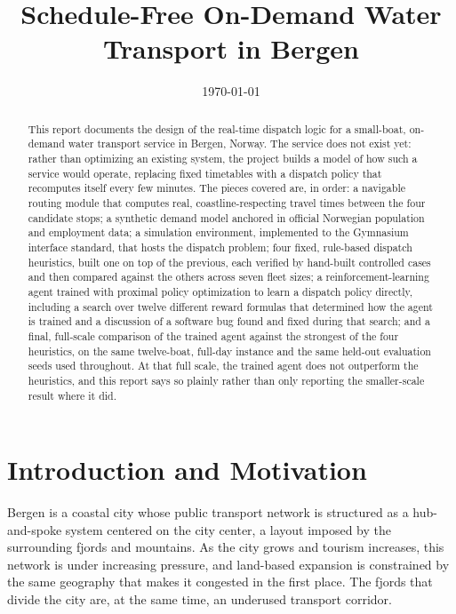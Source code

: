 \documentclass[11pt,a4paper]{article}
\title{Schedule-Free On-Demand Water Transport in Bergen}
\author{}
\date{\today}
\begin{document}
\maketitle

\begin{abstract}
\noindent
This report documents the design of the real-time dispatch logic for a small-boat, on-demand water transport service in Bergen, Norway. The service does not exist yet: rather than optimizing an existing system, the project builds a model of how such a service would operate, replacing fixed timetables with a dispatch policy that recomputes itself every few minutes. The pieces covered are, in order: a navigable routing module that computes real, coastline-respecting travel times between the four candidate stops; a synthetic demand model anchored in official Norwegian population and employment data; a simulation environment, implemented to the Gymnasium interface standard, that hosts the dispatch problem; four fixed, rule-based dispatch heuristics, built one on top of the previous, each verified by hand-built controlled cases and then compared against the others across seven fleet sizes; a reinforcement-learning agent trained with proximal policy optimization to learn a dispatch policy directly, including a search over twelve different reward formulas that determined how the agent is trained and a discussion of a software bug found and fixed during that search; and a final, full-scale comparison of the trained agent against the strongest of the four heuristics, on the same twelve-boat, full-day instance and the same held-out evaluation seeds used throughout. At that full scale, the trained agent does not outperform the heuristics, and this report says so plainly rather than only reporting the smaller-scale result where it did.
\end{abstract}

\tableofcontents
\newpage

\section{Introduction and Motivation}

Bergen is a coastal city whose public transport network is structured as a hub-and-spoke system centered on the city center, a layout imposed by the surrounding fjords and mountains. As the city grows and tourism increases, this network is under increasing pressure, and land-based expansion is constrained by the same geography that makes it congested in the first place. The fjords that divide the city are, at the same time, an underused transport corridor.
\end{document}
